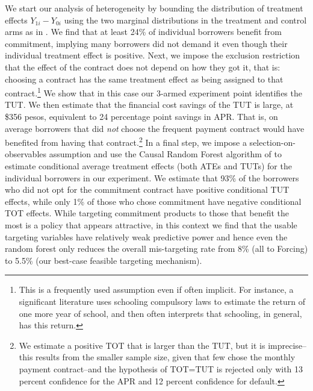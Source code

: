 \documentclass[oneside,11pt]{article}
\begin{document}
We start our analysis of heterogeneity by bounding the distribution of treatment effects $Y_{1i}-Y_{0i}$ using the two marginal distributions in the treatment and control arms as in \cite{fan2010sharp}. We find that at least 24\% of individual borrowers benefit from commitment, implying many borrowers did not demand it even though their individual treatment effect is positive. Next, we impose the exclusion restriction that the effect of the contract does not depend on how they got it, that is: choosing a contract has the same treatment effect as being assigned to that contract.\footnote{This is a frequently used assumption even if often implicit. For instance, a significant literature uses schooling compulsory laws to estimate the return of one more year of school, and then often interprets that schooling, in general, has this return.} We show that in this case our 3-armed experiment point identifies the TUT. We then estimate that the financial cost savings of the TUT is large, at \$356 pesos, equivalent to 24 percentage point savings in APR. That is, on average borrowers that did \textit{not} choose the frequent payment contract would have benefited from having that contract.\footnote{We estimate a positive TOT that is larger than the TUT, but it is imprecise--this results from the smaller sample size, given that few chose the monthly payment contract--and the hypothesis of TOT=TUT is rejected only with 13 percent confidence for the APR and 12 percent confidence for default.}  
In a final step, we impose a selection-on-observables assumption and use the Causal Random Forest algorithm of \cite{atheygrf} to estimate conditional average treatment effects (both ATEs and TUTs) for the individual borrowers in our experiment.  We estimate that 93\% of the borrowers who did not opt for the commitment contract have positive conditional TUT effects, while only 1\% of those who chose commitment have negative conditional TOT effects.   While targeting commitment products to those that benefit the most is a policy that appears attractive, in this context we find that the usable targeting variables have relatively weak predictive power and hence even the random forest only reduces the overall mis-targeting rate from 8\% (all to Forcing) to 5.5\% (our best-case feasible targeting mechanism).  
\end{document}
